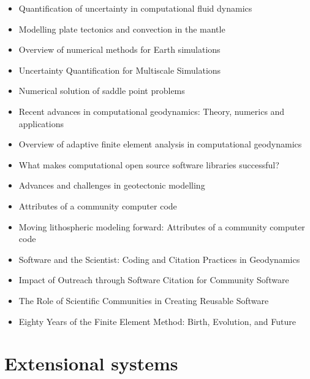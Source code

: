    \begin{itemize}
   \item [\nineteenninetyseven] Quantification of uncertainty in computational fluid dynamics \cite{roac97}
   \item [\twothousand] Modelling plate tectonics and convection in the mantle \cite{mogz00}
   \item [\twothousandone] Overview of numerical methods for Earth simulations \cite{momd01}
   \item [\twothousandtwo] Uncertainty Quantification for Multiscale Simulations \cite{degg02}
   \item [\twothousandfive] Numerical solution of saddle point problems \cite{begl05}
   \item [\twothousandeight] Recent advances in computational geodynamics: Theory, numerics and applications \cite{kags08}
   \item [\twothousandthirteen] Overview of adaptive finite element analysis in computational geodynamics \cite{masm13}
   \item [\twothousandthirteen] What makes computational open source software libraries successful? \cite{bahe13}
   \item [\twothousandfourteen] Advances and challenges in geotectonic modelling \cite{bufy14}
   \item [\twothousandfifteen] Attributes of a community computer code \cite{comc15}
   \item [\twothousandfifteen] Moving lithospheric modeling forward: Attributes of a community computer code \cite{comc15}
   \item [\twothousandseventeen] Software and the Scientist: Coding and Citation Practices in Geodynamics \cite{hwfs17}
   \item [\twothousandnineteen] Impact of Outreach through Software Citation for Community Software \cite{hwpc19}
   \item [\twothousandnineteen] The Role of Scientific Communities in Creating Reusable Software \cite{kehg19}
   \item [\twothousandtwentytwo] Eighty Years of the Finite Element Method: Birth, Evolution, and Future \cite{lilp22}
   \end{itemize}

\section{Extensional systems}

